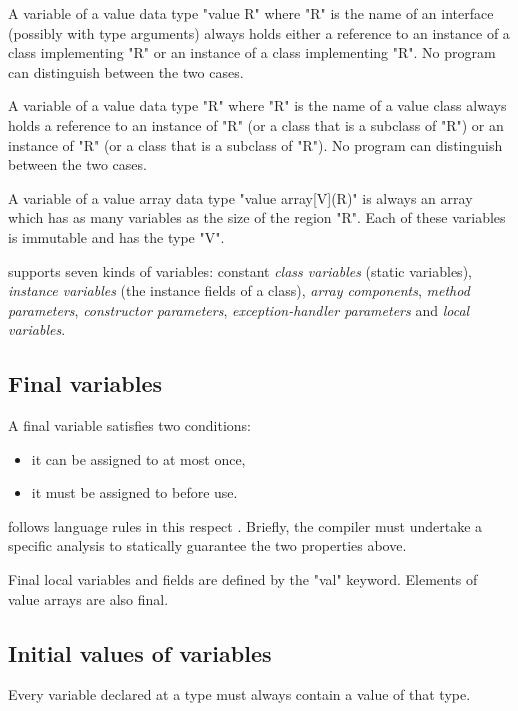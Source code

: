A variable of a value data type \xcd"value R" where \xcd"R" is the
name of an interface (possibly with type arguments) always holds
either a reference to an instance of a class implementing \xcd"R" or
an instance of a class implementing \xcd"R". No program can
distinguish between the two cases.

A variable of a value data type \xcd"R" where \xcd"R" is the name of a
value class always holds a reference to an instance of \xcd"R" (or a
class that is a subclass of \xcd"R") or an instance of \xcd"R" (or a
class that is a subclass of \xcd"R"). No program can distinguish
between the two cases.

A variable of a value array data type \xcd"value array[V](R)" is always an
array which has as many variables as the size of the region \xcd"R".
Each of these variables is immutable and has the type \xcd"V".

\Xten{} supports seven kinds of variables: constant {\em class
variables} (static variables), {\em instance variables} (the instance
fields of a class), {\em array components}, {\em method parameters},
{\em constructor parameters}, {\em exception-handler parameters} and
{\em local variables}.

\subsection{Final variables}\label{FinalVariable}
A final variable satisfies two conditions: 
\begin{itemize}
\item it can be assigned to at most once, 
\item it must be assigned to before use. 
\end{itemize}

\Xten{} follows \java{} language rules in this respect \cite[\S
4.5.4,8.3.1.2,16]{jls2}. Briefly, the compiler must undertake a
specific analysis to statically guarantee the two properties above.

Final local variables and fields are defined by the \xcd"val"
keyword.  Elements of value arrays are also final.


\subsection{Initial values of variables}
\label{NullaryConstructor}
\cbstart 
Every variable declared at a type must always contain a value of that type.


